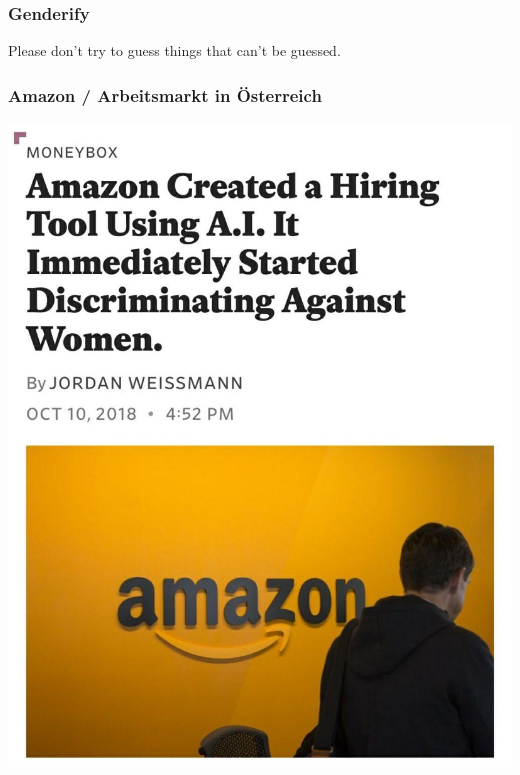 \documentclass[aspectratio=169,xcolor=dvipsnames]{beamer}
\begin{document}
\begin{frame}
\frametitle{Genderify}
\begin{center}
Please don't try to guess things that can't be guessed.
\end{center}
\end{frame}

\begin{frame}
\frametitle{Amazon / Arbeitsmarkt in Österreich}
\begin{center}
\includegraphics[height=0.7\paperheight,keepaspectratio]{images/amazon_hiring} 

\end{center}
\end{frame}
\end{document}
